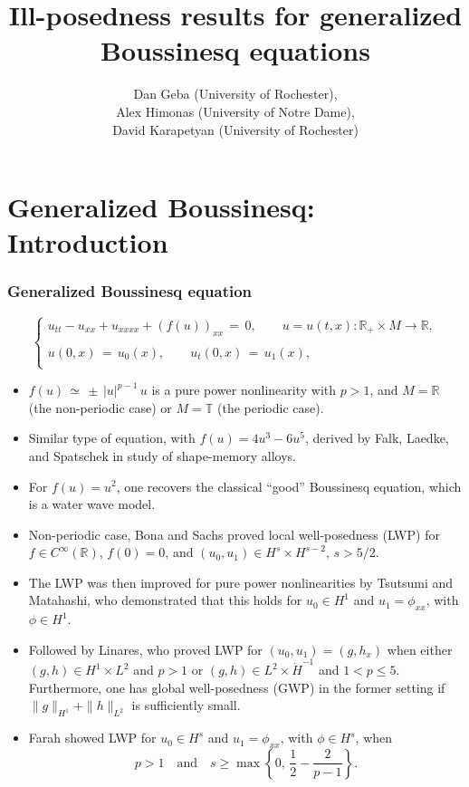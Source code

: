\documentclass{beamer}
\title[Ill-posedness for g-Boussinesq]{Ill-posedness results for generalized Boussinesq equations}
\author[Geba, Himonas, Karapetyan]{Dan Geba (University of Rochester), \\ Alex Himonas (University of Notre Dame), \\ David Karapetyan (University of Rochester)}
\institute[UR, ND]{}
\date{}
\numberwithin{equation}{section}
\begin{document}
\begin{frame}
\titlepage
\end{frame}
\section{Generalized Boussinesq: Introduction}
\begin{frame}
  \frametitle{Generalized Boussinesq equation}
\begin{equation*}
\left\{
\begin{array}{l}
u_{tt}-u_{xx}+u_{xxxx}+(f(u))_{xx}\,=\,0, \qquad u=u(t,x): \mathbb{R}_+\times M \to \mathbb{R},\\
\\
u(0,x)\,=\,u_0(x),\qquad u_t(0,x)\,=\,u_1(x),\\
\end{array}\right.
\label{main}
\end{equation*}
\pause
\begin{itemize}
  \item $f(u)\,\simeq\,\pm\,|u|^{p-1}\,u$ is a pure power nonlinearity with $p>1$,
and $M=\mathbb{R}$ (the non-periodic case) or $M=\mathbb{T}$ (the periodic case).
\end{itemize}
\pause
\end{frame}
\begin{frame}
  \begin{itemize}
    \item  Similar type of  equation, with $f(u)=4u^3-6u^5$, derived by Falk, Laedke, and Spatschek in study of shape-memory alloys. 
      \pause
    \item For $f(u) =  u^{2}$, one recovers the classical ``good'' Boussinesq equation, which is a water wave model. 
\pause
    \item Non-periodic case, Bona and Sachs proved local well-posedness (LWP) for $f\in C^\infty(\mathbb{R})$, $f(0)=0$, and $(u_0,u_1)\in H^s \times H^{s-2}$, $s>5/2$. 
  \end{itemize}
    \end{frame}
    \begin{frame}
      \begin{itemize}
    \item The LWP was then improved for pure power nonlinearities by Tsutsumi and Matahashi, who demonstrated that this holds for $u_0\in H^1$ and $u_1=\phi_{xx}$, with $\phi\in H^1$. 
      \pause
    \item Followed by Linares, who proved LWP for $(u_0,u_1)=(g, h_x)$ when either $(g,h) \in H^1\times L^2$ and $p>1$ or $(g,h) \in L^2 \times \dot{H}^{-1}$  and $1<p\leq 5$. Furthermore, one has global well-posedness (GWP) in the former setting if $\|g\|_{H^1}+\|h\|_{L^2}$ is sufficiently small. 
      \pause
    \item Farah showed LWP for $u_0\in H^s$ and $u_1=\phi_{xx}$, with $\phi\in H^s$, when
\[
p>1 \quad \text{and} \quad s\geq \max \left\{0,\,\frac{1}{2}-\frac{2}{p-1}\right\}. \]
\end{itemize}
\end{frame}
\end{document}
